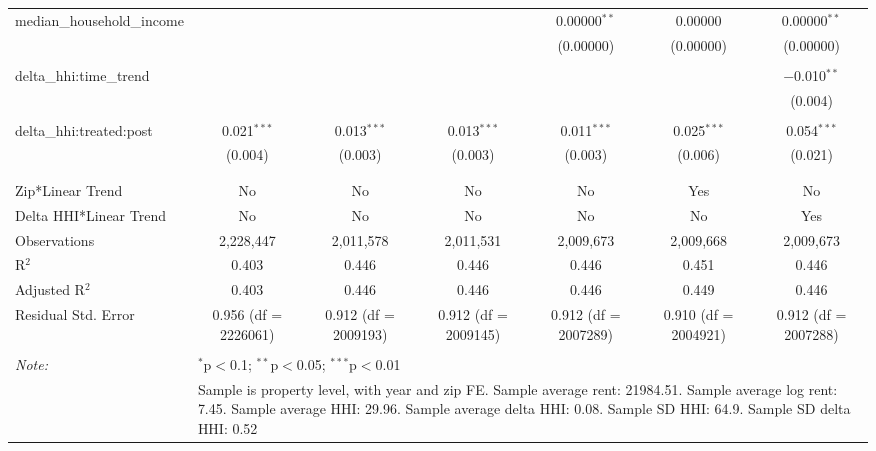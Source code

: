 \begin{table}[H]
{\begin{tabular}{@{\extracolsep{5pt}}lcccccc}
  median\_household\_income &  &  &  & 0.00000$^{**}$ & 0.00000 & 0.00000$^{**}$ \\  

   &  &  &  & (0.00000) & (0.00000) & (0.00000) \\  

   & & & & & & \\  

  delta\_hhi:time\_trend &  &  &  &  &  & $-$0.010$^{**}$ \\  

   &  &  &  &  &  & (0.004) \\  

   & & & & & & \\  

  delta\_hhi:treated:post & 0.021$^{***}$ & 0.013$^{***}$ & 0.013$^{***}$ & 0.011$^{***}$ & 0.025$^{***}$ & 0.054$^{***}$ \\  

   & (0.004) & (0.003) & (0.003) & (0.003) & (0.006) & (0.021) \\  

   & & & & & & \\  

 \hline \\[-1.8ex]  

 Zip*Linear Trend & No & No & No & No & Yes & No \\  

 Delta HHI*Linear Trend & No & No & No & No & No & Yes \\  

 Observations & 2,228,447 & 2,011,578 & 2,011,531 & 2,009,673 & 2,009,668 & 2,009,673 \\  

 R$^{2}$ & 0.403 & 0.446 & 0.446 & 0.446 & 0.451 & 0.446 \\  

 Adjusted R$^{2}$ & 0.403 & 0.446 & 0.446 & 0.446 & 0.449 & 0.446 \\  

 Residual Std. Error & 0.956 (df = 2226061) & 0.912 (df = 2009193) & 0.912 (df = 2009145) & 0.912 (df = 2007289) & 0.910 (df = 2004921) & 0.912 (df = 2007288) \\  

 \hline  

 \hline \\[-1.8ex]  

 \textit{Note:}  & \multicolumn{6}{l}{$^{*}$p$<$0.1; $^{**}$p$<$0.05; $^{***}$p$<$0.01} \\  

  & \multicolumn{6}{l}{Sample is property level, with year and zip FE. Sample average rent: 21984.51. Sample average log rent: 7.45. Sample average HHI: 29.96. Sample average delta HHI: 0.08. Sample SD HHI: 64.9. Sample SD delta HHI: 0.52} \\  

 \end{tabular}}  

 \end{table}  


